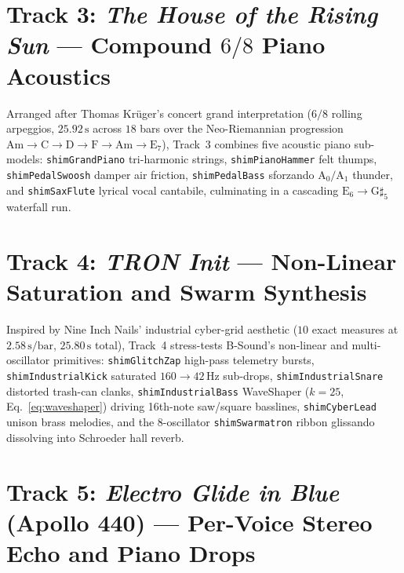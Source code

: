 \section{Track 3: \emph{The House of the Rising Sun} — Compound $6/8$ Piano Acoustics}

Arranged after Thomas Kr\"uger's concert grand interpretation ($6/8$ rolling arpeggios, $25.92\,\text{s}$ across $18$ bars over the Neo-Riemannian progression $\mathrm{Am} \to \mathrm{C} \to \mathrm{D} \to \mathrm{F} \to \mathrm{Am} \to \mathrm{E}_7$), Track~3 combines five acoustic piano sub-models: \texttt{shimGrandPiano} tri-harmonic strings, \texttt{shimPianoHammer} felt thumps, \texttt{shimPedalSwoosh} damper air friction, \texttt{shimPedalBass} sforzando $\mathrm{A}_0/\mathrm{A}_1$ thunder, and \texttt{shimSaxFlute} lyrical vocal cantabile, culminating in a cascading $\mathrm{E}_6 \to \mathrm{G}\sharp_5$ waterfall run.

\section{Track 4: \emph{TRON Init} — Non-Linear Saturation and Swarm Synthesis}

Inspired by Nine Inch Nails' industrial cyber-grid aesthetic ($10$ exact measures at $2.58\,\text{s/bar}$, $25.80\,\text{s}$ total), Track~4 stress-tests B-Sound's non-linear and multi-oscillator primitives: \texttt{shimGlitchZap} high-pass telemetry bursts, \texttt{shimIndustrialKick} saturated $160 \to 42\,\text{Hz}$ sub-drops, \texttt{shimIndustrialSnare} distorted trash-can clanks, \texttt{shimIndustrialBass} WaveShaper ($k = 25$, Eq.~\ref{eq:waveshaper}) driving 16th-note saw/square basslines, \texttt{shimCyberLead} unison brass melodies, and the 8-oscillator \texttt{shimSwarmatron} ribbon glissando dissolving into Schroeder hall reverb.

\section{Track 5: \emph{Electro Glide in Blue} (Apollo 440) — Per-Voice Stereo Echo and Piano Drops}

